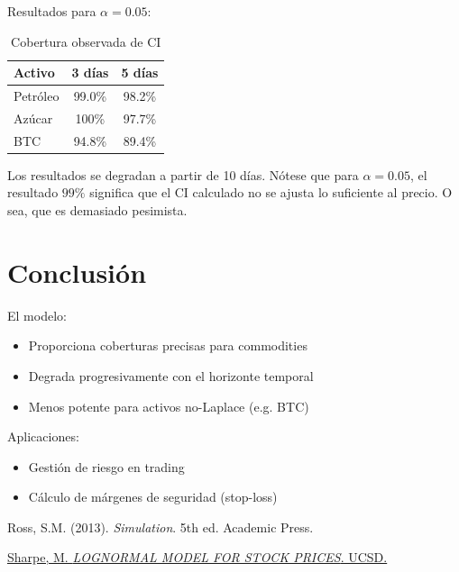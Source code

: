 \documentclass{article}
\begin{document}
Resultados para $\alpha=0.05$:
\begin{table}[h]
\centering
\begin{tabular}{lcc}
Activo & 3 días & 5 días \\
\hline
Petróleo & 99.0\% & 98.2\% \\
Azúcar & 100\% & 97.7\% \\
BTC & 94.8\% & 89.4\% \\
\end{tabular}
\caption{Cobertura observada de CI}
\end{table}

Los resultados se degradan a partir de 10 días.
Nótese que para $\alpha=0.05$, el resultado $99\%$ significa que el CI calculado no se ajusta lo suficiente al precio. O sea, que es demasiado pesimista.

\section{Conclusión}
El modelo:
\begin{itemize}
\item Proporciona coberturas precisas para commodities
\item Degrada progresivamente con el horizonte temporal
\item Menos potente para activos no-Laplace (e.g. BTC)
\end{itemize}

Aplicaciones:
\begin{itemize}
\item Gestión de riesgo en trading
\item Cálculo de márgenes de seguridad (stop-loss)
\end{itemize}

\begin{thebibliography}{9}
Ross, S.M. (2013). \textit{Simulation}. 5th ed. Academic Press.

\href{https://mathweb.ucsd.edu/~msharpe/stockgrowth.pdf}{Sharpe, M. \textit{LOGNORMAL MODEL FOR STOCK PRICES}. UCSD.}
\end{thebibliography}
\end{document}
